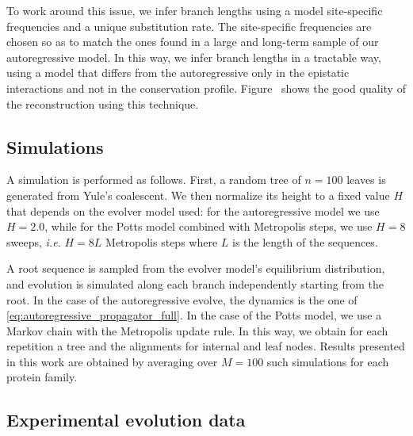 To work around this issue, we infer branch lengths using a model site-specific frequencies and a unique substitution rate. 
The site-specific frequencies are chosen so as to match the ones found in a large and long-term sample of our autoregressive model.
In this way, we infer branch lengths in a tractable way, using a model that differs from the autoregressive only in the epistatic interactions and not in the conservation profile. 
Figure~ shows the good quality of the reconstruction using this technique. 


\subsection{Simulations}

A simulation is performed as follows. 
First, a random tree of $n=100$ leaves is generated from Yule's coalescent. 
We then normalize its height to a fixed value $H$ that depends on the evolver model used: for the autoregressive model we use $H=2.0$, while for the Potts model combined with Metropolis steps, we use $H=8$ sweeps, \emph{i.e.} $H=8 L$ Metropolis steps where $L$ is the length of the sequences. 

A root sequence is sampled from the evolver model's equilibrium distribution, and evolution is simulated along each branch independently starting from the root. 
In the case of the autoregressive evolve, the dynamics is the one of \eqref{eq:autoregressive_propagator_full}. 
In the case of the Potts model, we use a Markov chain with the Metropolis update rule. 
In this way, we obtain for each repetition a tree and the alignments for internal and leaf nodes. 
Results presented in this work are obtained by averaging over $M=100$ such simulations for each protein family. 

\subsection{Experimental evolution data}

